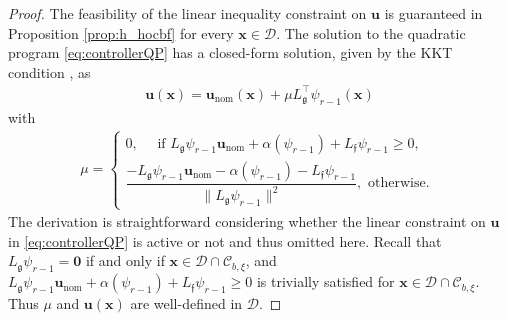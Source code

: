 \documentclass[letterpaper, 10 pt, journal, twoside]{IEEEtran}
\theoremstyle{plain}
\newcommand{\myvar}[1]{\bm{#1}}
\newcommand{\myset}[1]{\mathscr{#1}}
\begin{document}
\begin{proof}
	The feasibility of the linear inequality constraint on $ \myvar{u} $ is guaranteed in Proposition \ref{prop:h_hocbf} for every $ \myvar{x} \in \myset{D}  $. The solution to the quadratic program  \eqref{eq:controllerQP} has a closed-form solution, given by the KKT condition \cite{boyd2004convex}, as
	\begin{equation} \label{eq:controllerSol}
	\begin{aligned}
	\myvar{u}(\myvar{x}) = \myvar{u}_{\text{nom}}(\myvar{x}) +   \mu L_{\mathfrak{g}}^\top \psi_{r-1}(\myvar{x})
	\end{aligned}
	\end{equation}
	with 
	\begin{multline*}
	   	\mu  = \left\{ \begin{array}{l}
	0,   \quad  \text{   if }   L_{\mathfrak{g}}\psi_{r-1} \myvar{u}_{\text{nom}} + \alpha(\psi_{r-1}) + L_{\mathfrak{f}}\psi_{r-1} \ge 0 , \\
	   \dfrac{- L_{\mathfrak{g}}\psi_{r-1} \myvar{u}_{\text{nom}} - \alpha(\psi_{r-1}) - L_{\mathfrak{f}}\psi_{r-1}}{\| L_{\mathfrak{g}}\psi_{r-1} \|^2},  \text{ otherwise. }
	\end{array}\right. 
	\end{multline*}
The derivation is straightforward considering whether the linear constraint on $\myvar{u}$ in \eqref{eq:controllerQP} is active or not and thus omitted here. Recall that $ L_{\mathfrak{g}}\psi_{r-1} = \myvar{0} $ if and only if $ \myvar{x}\in  \myset{D}  \cap \myset{C}_{b,\xi} $, and  $L_{\mathfrak{g}}\psi_{r-1} \myvar{u}_{\text{nom}} + \alpha(\psi_{r-1}) + L_{\mathfrak{f}}\psi_{r-1} \ge 0 $ is trivially satisfied for $\myvar{x} \in \myset{D}\cap \myset{C}_{b,\xi} $. {Thus}  $\mu$ and $\myvar{u}(\myvar{x})$ are well-defined in $  \myset{D} $. 



\end{proof}
\end{document}
